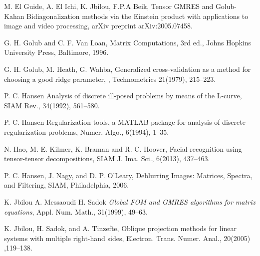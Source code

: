 \documentclass{siamltex}
\newcommand{\1}{\mathbb{1}}
\newcommand{\0}{\mathbb{0}}
\begin{document}
\begin{thebibliography}{99}
		
		M. El Guide, A. El Ichi, K. Jbilou, F.P.A Beik, Tensor GMRES and  Golub-Kahan Bidiagonalization methods via  the  Einstein product with applications to image and  video processing, arXiv preprint arXiv:2005.07458. 
		
		
		G. H. Golub and C. F. Van Loan, Matrix Computations, 3rd ed., Johns Hopkins University
		Press, Baltimore, 1996.
		
		{ G. H. Golub, M. Heath, G. Wahba}, Generalized
		cross-validation as a method for choosing a good ridge parameter,
		, Technometrics 21(1979), 215--223.
		
		
		{ P. C. Hansen} { Analysis of discrete ill-posed problems by
			means of the L-curve}, SIAM Rev., 34(1992), 561--580.
		
		
		{ P. C. Hansen} { Regularization tools, a MATLAB package for
			analysis of discrete regularization problems}, Numer. Algo., 6(1994), 1--35.
		
		N. Hao, M. E. Kilmer, K. Braman and R. C. Hoover, Facial recognition using tensor-tensor decompositions, SIAM J. Ima. Sci., 6(2013), 437--463.
		
		
		
		P. C. Hansen, J. Nagy, and D. P. O'Leary,  Deblurring Images: Matrices, Spectra, 
		and Filtering, SIAM, Philadelphia, 2006.
		
		
		{ K. Jbilou A. Messaoudi H. Sadok} {\it Global FOM and GMRES
			algorithms for matrix equations}, Appl. Num. Math.,  31(1999), 49--63.
		
		
		{ K. Jbilou, H. Sadok, and A. Tinzefte}, {Oblique projection methods for linear 
			systems with multiple right-hand sides}, Electron. Trans. Numer. Anal., 20(2005) ,119--138.
		

\end{thebibliography}
\end{document}
